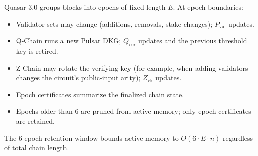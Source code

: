 Quasar 3.0 groups blocks into epochs of fixed length $E$. At epoch
boundaries:
\begin{itemize}[leftmargin=2em,nosep]
\item Validator sets may change (additions, removals, stake changes);
      $P_\text{val}$ updates.
\item Q-Chain runs a new Pulsar DKG; $Q_\text{cer}$ updates and
      the previous threshold key is retired.
\item Z-Chain may rotate the verifying key (for example, when adding
      validators changes the circuit's public-input arity);
      $Z_\text{vk}$ updates.
\item Epoch certificates summarize the finalized chain state.
\item Epochs older than 6 are pruned from active memory; only epoch
      certificates are retained.
\end{itemize}
The 6-epoch retention window bounds active memory to $O(6 \cdot E \cdot
n)$ regardless of total chain length.


